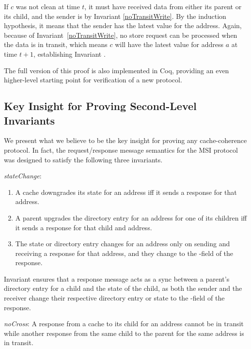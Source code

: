 If $c$ was not clean at time $t$, it must have received data from either its
parent or its child, and the sender is \clean{} by Invariant
\ref{noTransitWrite}. By the induction hypothesis, it means that the sender has
the latest value for the address. Again, because of
Invariant~\ref{noTransitWrite}, no store request can be processed when the data
is in transit, which means $c$ will have the latest value for address $a$ at
time $t+1$, establishing Invariant .

The full version of this proof is also implemented in Coq, providing an even
higher-level starting point for verification of a new protocol.

\subsection{Key Insight for Proving Second-Level Invariants}

We present what we believe to be the key insight for proving any cache-coherence protocol.
In fact, the request/response message semantics for the MSI protocol was designed to satisfy
the following three invariants.

\begin{inv}
\textit{stateChange}:
\begin{enumerate}
\item A cache downgrades its state for an address iff it sends a response for that address.
\item A parent upgrades the directory entry for an address for one of its
children iff it sends a response for that child and address.
\item The state or directory entry changes for an address only on sending and
receiving a response for that address, and they change to the \myto-field of the response.
\end{enumerate}
\label{stateChange}
\end{inv}

\vspace{-.1in}

Invariant  ensures that a response message acts as a sync
between a parent's directory entry for a child and the state of the child, as
both the sender and the receiver change their respective directory entry or
state to the \myto-field of the response.

\begin{inv}
\textit{noCross}: A response from a cache to its child for an address cannot
be in transit while another response from the same child to the parent for the
same address is in transit.
\label{noCross}
\end{inv}

